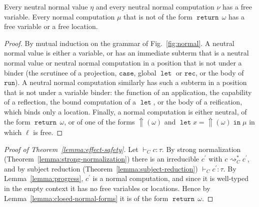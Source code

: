 \documentclass[acmsmall, screen, review, anonymous]{acmart}
\theoremstyle{definition}
\newcommand{\reflectname}{\mathord{\Uparrow}}
\newcommand{\performraw}[2]{\mathop{\reflectname(#1(#2))}}
\newcommand{\perform}[3]{\performraw{#1}{#2}(#3)}
\newcommand{\loc}{\ell}
\newcommand{\indelimname}{\mathtt{rec}}
\newcommand{\casename}{\mathtt{case}}
\newcommand{\types}{\mathrel{:}}
\newcommand{\returnname}{\mathop{\mathtt{return}}}
\newcommand{\return}[1]{\returnname\, #1}
\newcommand{\letvname}{\mathop{\mathtt{let}}}
\newcommand{\letv}[3]{\letvname #1 = #2 \mathop{\mathtt{in}} #3}
\newcommand{\grunname}{\mathtt{run}}
\newcommand{\turnc}{\mathrel{\vdash_C}}
\newcommand{\stepstoname}{\rightsquigarrow}
\newcommand{\reducestoname}{\stepstoname^{*}}
\newcommand{\reducestoc}{\reducestoname_{C}}
\begin{document}
\begin{lemma}
\label{lemma:closed-normal-forms}
  Every neutral normal value $\eta$ and every neutral normal
  computation $\nu$ has a free variable. Every normal computation $\mu$
  that is not of the form $\return{\omega}$ has a free variable or a
  free location.
\end{lemma}
\begin{proof}
  By mutual induction on the grammar of Fig.~\ref{fig:normal}. A neutral
  normal value is either a variable, or has an immediate subterm that is
  a neutral normal value or neutral normal computation in a position
  that is not under a binder (the scrutinee of a projection,
  $\casename$, global $\letvname$ or $\indelimname$, or the body of
  $\grunname$). A neutral normal computation similarly has such a
  subterm in a position that is not under a variable binder: the
  function of an application, the capability of a reflection, the bound
  computation of a $\letvname$, or the body of a reification, which
  binds only a location. Finally, a normal computation is either
  neutral, of the form $\return{\omega}$, or of one of the forms
  $\perform{\loc}{op}{\omega}$ and
  $\letv{x}{\perform{\loc}{op}{\omega}}{\mu}$ in which $\loc$ is free.
\end{proof}

\begin{proof}[Proof of Theorem~\ref{lemma:effect-safety}]
  Let $\turnc c \types \tau$. By strong normalization
  (Theorem~\ref{lemma:strong-normalization}) there is an irreducible
  $c^{\prime}$ with $c \reducestoc c^{\prime}$, and by subject
  reduction (Theorem~\ref{lemma:subject-reduction})
  $\turnc c^{\prime} \types \tau$. By Lemma~\ref{lemma:progress},
  $c^{\prime}$ is a normal computation, and since it is well-typed in
  the empty context it has no free variables or locations. Hence by
  Lemma~\ref{lemma:closed-normal-forms} it is of the form
  $\return{\omega}$.
\end{proof}
\end{document}
